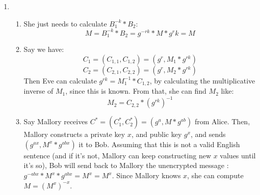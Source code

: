 \begin{enumerate}
  \item
    \begin{enumerate}
      \item She just needs to calculate $B_1^{-k} * B_2$:
        $$ M = B_1^{-k} * B_2 = g^{-rk} * M * g^rk = M $$
      \item Say we have:
        $$C_1 = (C_{1,1}, C_{1,2}) = (g^r, M_1 * g^{rk})$$
        $$C_2 = (C_{2,1}, C_{2,2}) = (g^r, M_2 * g^{rk})$$
        Then Eve can calculate $g^{rk} = M_1^{-1} * C_{1,2}$, by calculating the multiplicative inverse of $M_1$, since this is known. From that, she can find $M_2$ like:
        $$M_2 = C_{2,2} * (g^{rk})^{-1}$$

      \item Say Mallory receives $C^* = (C_1^*, C_2^*) = (g^a, M * g^{ab})$ from Alice. Then, Mallory constructs a private key $x$, and public key $g^x$, and sends $(g^{ax}, M^x * g^{abx})$ it to Bob. Assuming that this is not a valid English sentence (and if it's not, Mallory can keep constructing new $x$ values until it's so), Bob will send back to Mallory the unencrypted message : $g^{-abx} * M^x * g^{abx} = M^x = M^x$. Since Mallory knows $x$, she can compute $M = (M^x)^{-x}$.
    \end{enumerate}

  \end{enumerate}

